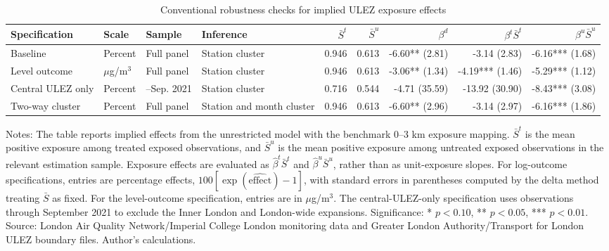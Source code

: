 \begin{table}[!htbp]\centering
\caption{Conventional robustness checks for implied ULEZ exposure effects}
\label{tab:ulez_conventional_robustness}
\begin{threeparttable}
\scriptsize
\setlength{\tabcolsep}{2pt}
\renewcommand{\arraystretch}{1.08}
\begin{tabularx}{\textwidth}{@{}>{\RaggedRight\arraybackslash}X>{\RaggedRight\arraybackslash}p{}>{\RaggedRight\arraybackslash}p{}>{\RaggedRight\arraybackslash}p{}rrrrr@{}}
\toprule
Specification & Scale & Sample & Inference & $\bar S^t$ & $\bar S^u$ & $\beta^d$ & $\beta^t\bar S^t$ & $\beta^u\bar S^u$ \\
\midrule
Baseline & Percent & Full panel & Station cluster & 0.946 & 0.613 & -6.60** (2.81) & -3.14 (2.83) & -6.16*** (1.68) \\
Level outcome & $\mu$g/m$^3$ & Full panel & Station cluster & 0.946 & 0.613 & -3.06** (1.34) & -4.19*** (1.46) & -5.29*** (1.12) \\
Central ULEZ only & Percent & 2016--Sep. 2021 & Station cluster & 0.716 & 0.544 & -4.71 (35.59) & -13.92 (30.90) & -8.43*** (3.08) \\
Two-way cluster & Percent & Full panel & Station and month cluster & 0.946 & 0.613 & -6.60** (2.96) & -3.14 (2.97) & -6.16*** (1.86) \\
\bottomrule
\end{tabularx}
\begin{tablenotes}[flushleft]
\footnotesize
\item Notes: The table reports implied effects from the unrestricted model with the benchmark 0--3 km exposure mapping. $\bar S^t$ is the mean positive exposure among treated exposed observations, and $\bar S^u$ is the mean positive exposure among untreated exposed observations in the relevant estimation sample. Exposure effects are evaluated as $\hat\beta^t\bar S^t$ and $\hat\beta^u\bar S^u$, rather than as unit-exposure slopes. For log-outcome specifications, entries are percentage effects, $100[\exp(\widehat{\mathrm{effect}})-1]$, with standard errors in parentheses computed by the delta method treating $\bar S$ as fixed. For the level-outcome specification, entries are in $\mu$g/m$^3$. The central-ULEZ-only specification uses observations through September 2021 to exclude the Inner London and London-wide expansions. Significance: * $p<0.10$, ** $p<0.05$, *** $p<0.01$. Source: London Air Quality Network/Imperial College London monitoring data and Greater London Authority/Transport for London ULEZ boundary files. Author's calculations.
\end{tablenotes}
\end{threeparttable}
\end{table}
